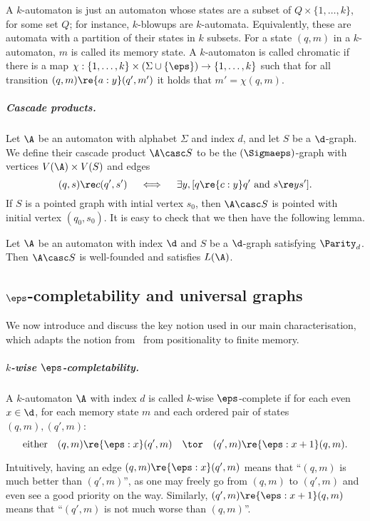 A $k$-automaton is just an automaton whose states are a subset of $Q \times \{1,\dots,k\}$, for some set $Q$; for instance, $k$-blowups are $k$-automata.
Equivalently, these are automata with a partition of their states in $k$ subsets.
For a state $(q,m)$ in a $k$-automaton, $m$ is called its memory state.
A $k$-automaton is called chromatic if there is a map $\chi:  \{1,\dots, k\} \times (\Sigma \cup \{\eps\}) \to  \{1,\dots, k\}$ such that for all transition $(q,m) \re{a:y} (q',m')$ it holds that $m'=\chi(q,m)$.

\subparagraph{Cascade products.} Let $\A$ be an automaton with alphabet $\Sigma$ and index $d$, and let $S$ be a $\d$-graph.
We define their cascade product $\A \casc S$ to be the $(\Sigmaeps)$-graph with vertices $V(\A) \times V(S)$ and edges
\[
    (q,s) \re c (q',s') \quad \iff \quad \exists y, [q \re {c:y} q' \text{ and } s \re y s'].
\]
If $S$ is a pointed graph with intial vertex $s_0$, then $\A \casc S$ is pointed with initial vertex $(q_0,s_0)$.
It is easy to check that we then have the following lemma.

\begin{lemma}\label{lem:cascade_products}
    Let $\A$ be an automaton with index $\d$ and $S$ be a $\d$-graph satisfying $\Parity_d$.
    Then $\A \casc S$ is well-founded and satisfies $L(\A)$.
\end{lemma}

\subsection{$\eps$-completability and universal graphs}
We now introduce and discuss the key notion used in our main characterisation, which adapts the notion from~\cite{CO24Positional} from positionality to finite memory.

\subparagraph*{$k$-wise $\eps$-completability.}
A $k$-automaton $\A$ with index $d$ is called $k$-wise $\eps$-complete if for each even $x \in \d$, for each memory state $m$ and each ordered pair of states $(q,m),(q',m)$:
\[
    \text{either} \quad (q,m) \re{\eps:x} (q',m) \quad \tor \quad (q',m) \re{\eps:x+1} (q,m). %
\]

Intuitively, having an edge $(q,m) \re{\eps:x} (q',m)$ means that ``$(q,m)$ is much better than $(q',m)$'', as one may freely go from $(q,m)$ to $(q',m)$ and even see a good priority on the way.
Similarly, $(q',m) \re{\eps:x+1} (q,m)$ means that ``$(q',m)$ is not much worse than $(q,m)$''.

